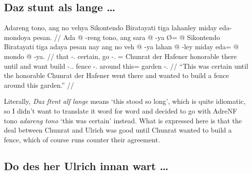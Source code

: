 \documentclass[12pt,paper=a4]{scrartcl}
\newcommand{\fw}[1]{\textit{#1}} %
\newcommand{\xayr}[3]{{\Tagati #1} \emph{#2} \enquote*{#3}}
\begin{document}
\subsection*{Daz stunt als lange …}


\ex \begingl
	\glpreamble Adareng tono, ang no vehya Sikontendo Biratayati tiga
		lahanley miday eda-mondoya pesan. //
	\gla Ada @ -reng tono, ang sara @ -ya Ø= @ Sikontendo Biratayati tiga
		adaya pesan nay ang no veh @ -ya lahan @ -ley miday eda= @ mondo 
		@ -ya. //
	\glb that -\Aarg{}.\Inan{} certain, \AgtT{} go -\Tsg{}.\M{} \Top{}= 
		Chunrat {der Hafener} honorable there until and \AgtT{} want 
		build -\Tsg{}.\M{}.\Top{} fence -\Parg{}.\Inan{} around this= 
		garden -\Loc{}. //
	\glft \enquote{This was certain until the honorable Chunrat der Hafener 
		went there and wanted to build a fence around this garden.} //
\endgl \xe

Literally, \fw{Daz ſtvnt alſ lange} means `this stood so long', which is 
quite idiomatic, so I didn't want to translate it word for word and decided to 
go with \xayr{AdreNF tono}{adareng tono}{this was certain} instead. What is 
expressed here is that the deal between Chunrat and Ulrich was good until 
Chunrat wanted to build a fence, which of course runs counter their agreement.

\subsection*{Do des her Ulrich innan wart …}

\end{document}
